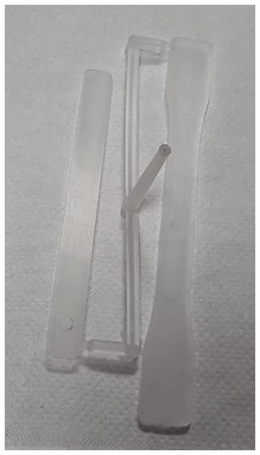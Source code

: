 \documentclass[a4paper, 11pt]{article}
\begin{document}
\begin{figure}[htp]
{\includegraphics[scale=0.25]{PP}} \\
\subfloat[][]

\end{figure}
\end{document}
